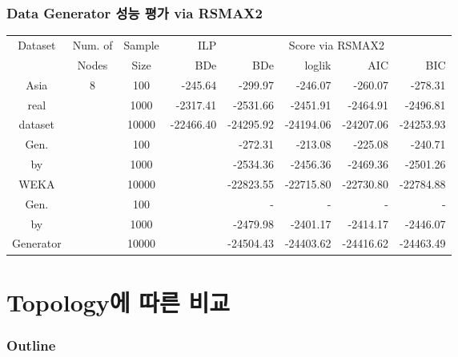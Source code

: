 \documentclass{beamer}
\begin{document}
\begin{frame}
\frametitle{Data Generator 성능 평가 via RSMAX2}
{\scriptsize{}

\begin{center}
\begin{tabular}{c|c|c|r|r|r|r|r}
\hline 
\multirow{2}{*}{{\tiny{}Dataset}} & {\tiny{}Num. of} & {\tiny{}Sample} & {\tiny{}ILP} & \multicolumn{4}{c}{{\tiny{}Score via RSMAX2}}\tabularnewline
\cline{4-8} 
 & {\tiny{}Nodes} & {\tiny{}Size} & {\tiny{}BDe} & {\tiny{}BDe} & {\tiny{}loglik} & {\tiny{}AIC} & {\tiny{}BIC}\tabularnewline
\hline 
{\tiny{}Asia} & \multirow{9}{*}{{\tiny{}8}} & {\tiny{}100} & {\tiny{}-245.64} & {\tiny{}-299.97} & {\tiny{}-246.07} & {\tiny{}-260.07} & {\tiny{}-278.31}\tabularnewline
{\tiny{}real} &  & {\tiny{}1000} & {\tiny{}-2317.41} & {\tiny{}-2531.66} & {\tiny{}-2451.91} & {\tiny{}-2464.91} & {\tiny{}-2496.81}\tabularnewline
{\tiny{}dataset} &  & {\tiny{}10000} & {\tiny{}-22466.40} & {\tiny{}-24295.92} & {\tiny{}-24194.06} & {\tiny{}-24207.06} & {\tiny{}-24253.93}\tabularnewline
\cline{1-1} \cline{3-8} 
{\tiny{}Gen.} &  & {\tiny{}100} &  & {\tiny{}-272.31} & {\tiny{}-213.08} & {\tiny{}-225.08} & {\tiny{}-240.71}\tabularnewline
{\tiny{}by} &  & {\tiny{}1000} &  & {\tiny{}-2534.36} & {\tiny{}-2456.36} & {\tiny{}-2469.36} & {\tiny{}-2501.26}\tabularnewline
{\tiny{}WEKA} &  & {\tiny{}10000} &  & {\tiny{}-22823.55} & {\tiny{}-22715.80} & {\tiny{}-22730.80} & {\tiny{}-22784.88}\tabularnewline
\cline{1-1} \cline{3-8} 
{\tiny{}Gen.} &  & {\tiny{}100} &  & {\tiny{}-} & {\tiny{}-} & {\tiny{}-} & {\tiny{}-}\tabularnewline
{\tiny{}by} &  & {\tiny{}1000} &  & {\tiny{}-2479.98} & {\tiny{}-2401.17} & {\tiny{}-2414.17} & {\tiny{}-2446.07}\tabularnewline
{\tiny{}Generator} &  & {\tiny{}10000} &  & {\tiny{}-24504.43} & {\tiny{}-24403.62} & {\tiny{}-24416.62} & {\tiny{}-24463.49}\tabularnewline
\hline 
\end{tabular}
\end{center}

}
\end{frame}



\section{Topology에 따른 비교}
\begin{frame}
\frametitle{Outline}
{\scriptsize{}
	\tableofcontents[currentsection]
}
\end{frame}
\end{document}
